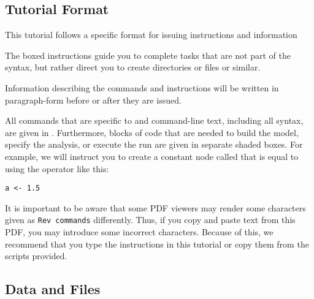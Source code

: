 
\medskip
\subsection{Tutorial Format}\label{subsect:Exercise-Format}

This tutorial follows a specific format for issuing instructions and information

{\begin{framed}
The boxed instructions guide you to complete tasks that are not part of the \RevBayes syntax, but rather direct you to create directories or files or similar.
\end{framed}}

Information describing the commands and instructions will be written in paragraph-form before or after they are issued.

All commands that are specific to \RevBayes and command-line text, including all \Rev syntax, are given in . 
Furthermore, blocks of \Rev code that are needed to build the model, specify the analysis, or execute the run are given in separate shaded boxes.
For example, we will instruct you to create a constant node called  that is equal to  using the \cl{<-} operator like this:
{\tt \begin{snugshade*}
\begin{lstlisting}
a <- 1.5
\end{lstlisting}
\end{snugshade*}}

It is important to be aware that some PDF viewers may render some characters given as \colorbox{shadecolor}{\tt{Rev commands}} differently. 
Thus, if you copy and paste text from this PDF, you may introduce some incorrect characters. 
Because of this, we recommend that you type the instructions in this tutorial or copy them from the scripts provided. 


\medskip
\subsection{Data and Files}\label{subsect:Exercise-DataFiles}

